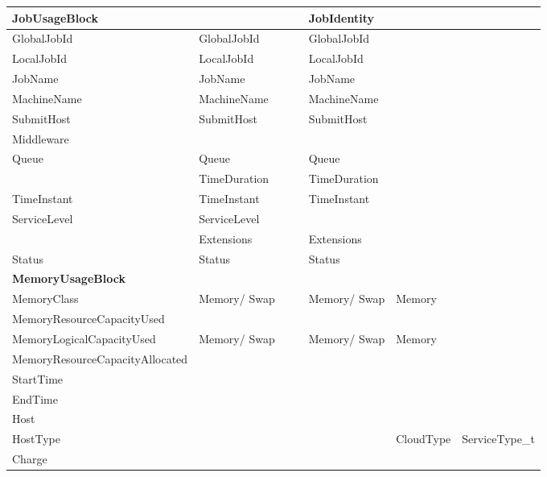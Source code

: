 \begin{longtable}{ | p{} | p{} | p{} | p{} | p{} | p{} | p{} | }
\textbf{Job\-Usage\-Block}& 			& 			&			& \textbf{Job\-Identity}& 						& \\ \hline
GlobalJobId		& GlobalJobId		& 			&			& GlobalJobId		& 						& \\ \hline
LocalJobId		& LocalJobId		& 			&			& LocalJobId		& 						& \\ \hline
JobName			& JobName		& 			&			& JobName		& 						& \\ \hline
Machine\-Name		& Machine\-Name		& 			&			& Machine\-Name		& 						& \\ \hline
SubmitHost		& SubmitHost		& 			&			& SubmitHost		& 						& \\ \hline
Middleware		& 			& 			&			& 			& 						& \\ \hline
Queue			& Queue			& 			&			& Queue			& 						& \\ \hline
			& Time\-Duration	& 			&			& Time\-Duration	& 						& \\ \hline
TimeInstant		& TimeInstant		& 			&			& TimeInstant		& 						& \\ \hline
ServiceLevel		& ServiceLevel		& 			&			& 			& 						& \\ \hline
			& Extensions		& 			&			& Extensions		& 					& \\
\hline
Status			& Status		& 			&			& Status		& 						& \\ \hline\hline






\textbf{Memory\-Usage\-Block}&			&			&			&			&						& \\ \hline
Memory\-Class		& Memory/ Swap		& 			&			& Memory/ Swap		& Memory					& \\ \hline
Memory\-Resource\-Capacity\-Used& 		&			& 			& 			&						& \\ \hline
Memory\-Logical\-Capacity\-Used& Memory/ Swap	& 			&			& Memory/ Swap		& Memory					& \\ \hline
Memory\-Resource\-Capacity\-Allocated& 		& 			&			& 			& 						& \\ \hline
StartTime		& 			& 			&			& 			& 						& \\ \hline
EndTime			& 			& 			&			& 			& 						& \\ \hline
Host			& 			& 			&			& 			& 						& \\ \hline
HostType		& 			& 			&			& 			& CloudType					& ServiceType\_t\\ \hline
Charge			& 			& 			&			& 			& 						& \\ \hline\hline




\end{longtable}
